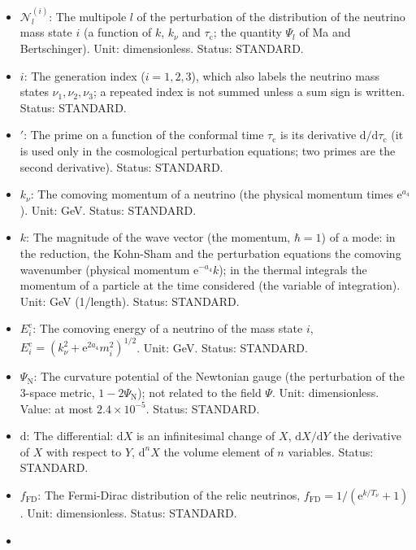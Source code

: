 \documentclass[
  10pt,
]{article}
\providecommand{\tightlist}{%
  \setlength{\itemsep}{0pt}\setlength{\parskip}{0pt}}
\begin{document}
\begin{itemize}
\tightlist
\item
  \(\mathcal{N}^{(i)}_l\): The multipole \(l\) of the perturbation of
  the distribution of the neutrino mass state \(i\) (a function of
  \(k\), \(k_\nu\) and \(\tau_{\mathrm{c}}\); the quantity \(\Psi_l\) of
  Ma and Bertschinger). Unit: dimensionless. Status: STANDARD.
\item
  \(i\): The generation index (\(i = 1, 2, 3\)), which also labels the
  neutrino mass states \(\nu_1, \nu_2, \nu_3\); a repeated index is not
  summed unless a sum sign is written. Status: STANDARD.
\item
  \({}'\): The prime on a function of the conformal time
  \(\tau_{\mathrm{c}}\) is its derivative
  \(\mathrm{d}/\mathrm{d}\tau_{\mathrm{c}}\) (it is used only in the
  cosmological perturbation equations; two primes are the second
  derivative). Status: STANDARD.
\item
  \(k_\nu\): The comoving momentum of a neutrino (the physical momentum
  times \(\mathrm{e}^{a_4}\)). Unit: GeV. Status: STANDARD.
\item
  \(k\): The magnitude of the wave vector (the momentum, \(\hbar = 1\))
  of a mode: in the reduction, the Kohn-Sham and the perturbation
  equations the comoving wavenumber (physical momentum
  \(\mathrm{e}^{-a_4}k\)); in the thermal integrals the momentum of a
  particle at the time considered (the variable of integration). Unit:
  GeV (1/length). Status: STANDARD.
\item
  \(E^{\mathrm{c}}_i\): The comoving energy of a neutrino of the mass
  state \(i\),
  \(E^{\mathrm{c}}_i = (k_\nu^2 + \mathrm{e}^{2a_4}m_i^2)^{1/2}\). Unit:
  GeV. Status: STANDARD.
\item
  \(\Psi_{\mathrm{N}}\): The curvature potential of the Newtonian gauge
  (the perturbation of the 3-space metric, \(1 - 2\Psi_{\mathrm{N}}\));
  not related to the field \(\Psi\). Unit: dimensionless. Value: at most
  \(2.4\times10^{-5}\). Status: STANDARD.
\item
  \(\mathrm{d}\): The differential: \(\mathrm{d}X\) is an infinitesimal
  change of \(X\), \(\mathrm{d}X/\mathrm{d}Y\) the derivative of \(X\)
  with respect to \(Y\), \(\mathrm{d}^nX\) the volume element of \(n\)
  variables. Status: STANDARD.
\item
  \(f_{\mathrm{FD}}\): The Fermi-Dirac distribution of the relic
  neutrinos, \(f_{\mathrm{FD}} = 1/(\mathrm{e}^{k/T_\nu} + 1)\). Unit:
  dimensionless. Status: STANDARD.
\item

\end{itemize}
\end{document}
